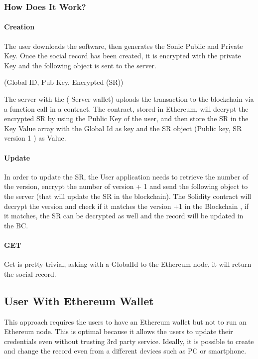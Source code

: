 \subsubsection{How Does It Work?}

\paragraph{Creation}

The user downloads the software, then generates the Sonic Public and Private Key. Once the social record has been created, it is encrypted with the private Key and the following object is sent to the server.

(Global ID, Pub Key, Encrypted (SR))

The server with the ( Server wallet) uploads the transaction to the blockchain via a function call in a contract. The contract, stored in Ethereum, will decrypt the encrypted SR by using the Public Key of the user,  and then store the SR in the Key Value array with the Global Id as key and the SR object (Public key, SR version 1 ) as Value.

\paragraph{Update}

In order to update the SR, the User application needs to retrieve the number of the version, encrypt the number of version + 1 and send the following object to the server (that will update the SR in the blockchain). The Solidity contract will decrypt the version and check if it matches the version +1 in the Blockchain , if it matches, the SR can be decrypted as well and the record will be updated in the BC.

\paragraph{GET}

Get is pretty trivial, asking with a GlobalId to the Ethereum node, it will return the social record.

\subsection{User With Ethereum Wallet}

This approach requires the users to have an Ethereum wallet but not to run an Ethereum node.
This is optimal because it allows the users to update their credentials even without trusting 3rd party service. Ideally, it is possible to create and change the record even from a different devices such as PC or smartphone.

